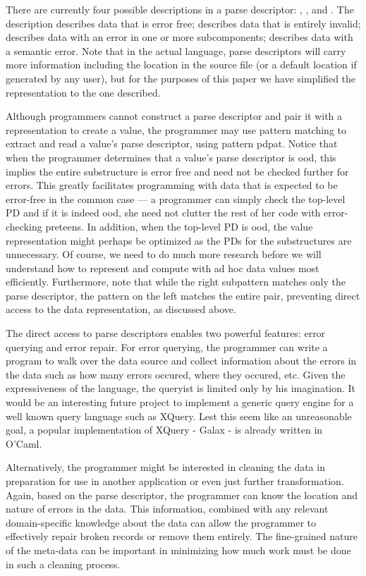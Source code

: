 \documentclass{entcs}
\begin{document}
There are currently four possible descriptions in a parse descriptor:
\pdgood{}, \pdbad{},\pdnest{} and \pdsem{}. The description \pdgood{}
describes data that is error free; \pdbad{} describes data that is
entirely invalid; \pdnest{} describes data with an error in one or
more subcomponents; \pdsem{} describes data with a semantic error.
Note that in the actual language, parse descriptors will carry more
information including the location in the source file (or a default
location if generated by any user), but for the purposes of this paper
we have simplified the representation to the one described. 

Although programmers cannot construct a parse descriptor and pair it
with a representation to create a value, the programmer may use
pattern matching to extract and read a value's parse descriptor, using
pattern  {pdpat}.  Notice that when the programmer
determines that a value's parse descriptor is ood, this implies
the entire substructure is error free and need not be checked further
for errors.  This greatly facilitates programming with data that is
expected to be error-free in the common case --- a programmer can
simply check the top-level PD and if it is indeed ood, she need
not clutter the rest of her code with error-checking preteens.  In
addition, when the top-level PD is ood, the value representation
might perhaps be optimized as the PDs for the substructures are
unnecessary.  Of course, we need to do much more research before we
will understand how to represent and compute with ad hoc data values
most efficiently. Furthermore, note that while the right subpattern
matches only the parse descriptor, the pattern on the left matches the
entire pair, preventing direct access to the data representation, as
discussed above.

The direct access to parse descriptors enables two powerful features:
error querying and error repair. For error querying, the programmer
can write a program to walk over the data source and collect
information about the errors in the data such as how many errors
occured, where they occured, etc. Given the expressiveness of the
language, the queryist is limited only by his imagination. It would be
an interesting future project to implement a generic query engine for
a well known query language such as XQuery. Lest this seem like an
unreasonable goal, a popular implementation of XQuery - Galax - is
already written in O'Caml.

Alternatively, the programmer might be interested in cleaning the data
in preparation for use in another application or even just further
transformation. Again, based on the parse descriptor, the programmer
can know the location and nature of errors in the data. This
information, combined with any relevant domain-specific knowledge
about the data can allow the programmer to effectively repair broken
records or remove them entirely. The fine-grained nature of the
meta-data can be important in minimizing how much work must be done in
such a cleaning process.
\end{document}
